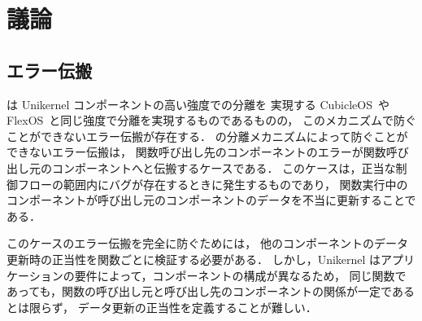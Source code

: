 \section{議論}
\label{sec:disc}

\subsection{エラー伝搬}

\sysname は Unikernel コンポーネントの高い強度での分離を
実現する CubicleOS~\cite{SartakovEtAl-ASPLOS21}や FlexOS~\cite{LefeuvreEtAl-FlexOS}と同じ強度で分離を実現するものであるものの，
このメカニズムで防ぐことができないエラー伝搬が存在する．
\sysname の分離メカニズムによって防ぐことができないエラー伝搬は，
関数呼び出し先のコンポーネントのエラーが関数呼び出し元のコンポーネントへと伝搬するケースである．
このケースは，正当な制御フローの範囲内にバグが存在するときに発生するものであり，
関数実行中のコンポーネントが呼び出し元のコンポーネントのデータを不当に更新することである．

このケースのエラー伝搬を完全に防ぐためには，
他のコンポーネントのデータ更新時の正当性を関数ごとに検証する必要がある．
しかし，Unikernel はアプリケーションの要件によって，コンポーネントの構成が異なるため，
同じ関数であっても，関数の呼び出し元と呼び出し先のコンポーネントの関係が一定であるとは限らず，
データ更新の正当性を定義することが難しい．


